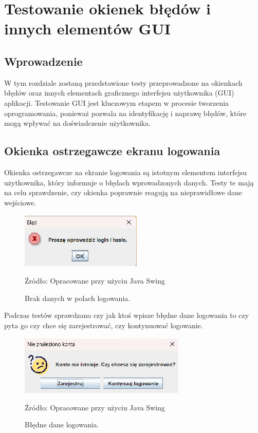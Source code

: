 \chapter{Testowanie okienek błędów i innych elementów GUI}
\label{chap:testowanie}

\section*{Wprowadzenie}
W tym rozdziale zostaną przedstawione testy przeprowadzone na okienkach błędów oraz innych elementach graficznego interfejsu użytkownika (GUI) aplikacji. Testowanie GUI jest kluczowym etapem w procesie tworzenia oprogramowania, ponieważ pozwala na identyfikację i naprawę błędów, które mogą wpływać na doświadczenie użytkownika.

\section{Okienka ostrzegawcze ekranu logowania}
Okienka ostrzegawcze na ekranie logowania są istotnym elementem interfejsu użytkownika, który informuje o błędach wprowadzonych danych. Testy te mają na celu sprawdzenie, czy okienka poprawnie reagują na nieprawidłowe dane wejściowe.
\begin{figure}[H]
    \centering
    \includegraphics[width=0.8\linewidth]{figures/l1.eps}
    \caption{Brak danych w polach logowania.}
    \label{fig:login_win}
    \small{Źródło: Opracowane przy użyciu Java Swing}
\end{figure}


Podczas testów sprawdzano czy jak ktoś wpisze błędne dane logowania to czy pyta go czy chce się zarejestrować, czy kontynuować logowanie.

\begin{figure}[H]
    \centering
    \includegraphics[width=0.8\linewidth]{figures/l2.eps}
    \caption{Błędne dane logowania.}
    \label{fig:login_win}
    \small{Źródło: Opracowane przy użyciu Java Swing}
\end{figure}


